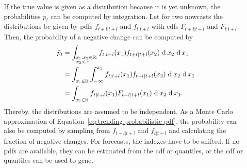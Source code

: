 If the true value is given as a distribution because it is yet unknown, the probabilities $p_t$ can be computed by integration.
Let for two nowcasts the distributions be given by \acp{pdf} $f_{t+l|t+l}$ and $f_{t|t+l}$ with \acp{cdf}  $F_{t+l|t+l}$ and $F_{t|t+l}$.
Then, the probability of a negative change can be computed by
\begin{align}
    \bar{p}_t
        &= \int_{\begin{subarray}{l}x_1, x_2 \in \R: \\ x_2 < x_1\end{subarray}} f_{t|t+l} (x_1) f_{t+l|t+l} (x_2)  \ \textrm{d} \: x_2 \ \textrm{d} \: x_1 \nonumber\\
        &= \int_{x_1 \in \R} \int_{-\infty}^{x_1} f_{t|t+l} (x_1) f_{t+l|t+l} (x_2)  \ \textrm{d} \: x_2 \ \textrm{d} \: x_1 \nonumber\\
        &= \int_{x_1 \in \R} f_{t|t+l} (x_1) F_{t+l|t+l} (x_1)  \ \textrm{d} \: x_2 \ \textrm{d} \: x_1 \label{eq:trending-probabilistic-pdf}.
\end{align}
Thereby, the distributions are assumed to be independent.
As a Monte Carlo approximation of Equation~\eqref{eq:trending-probabilistic-pdf}, the probability can also be computed by sampling from $f_{t+l|t+l}$ and $f_{t|t+l}$ and calculating the fraction of negative changes.
For forecasts, the indexes have to be shifted.
If no \acp{pdf} are available, they can be estimated from the \ac{cdf} or quantiles, or the \ac{cdf} or quantiles can be used to gene.
